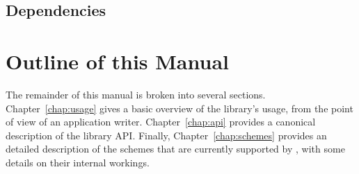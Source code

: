 \subsection{Dependencies}

\section{Outline of this Manual}

The remainder of this manual is broken into several sections.  Chapter~\ref{chap:usage} gives a basic overview of the library's usage, from the point of view of an application writer.  Chapter~\ref{chap:api} provides a canonical description of the library API.  Finally, Chapter~\ref{chap:schemes} provides an detailed description of the schemes that are currently supported by {\libraryshort}, with some details on their internal workings.

